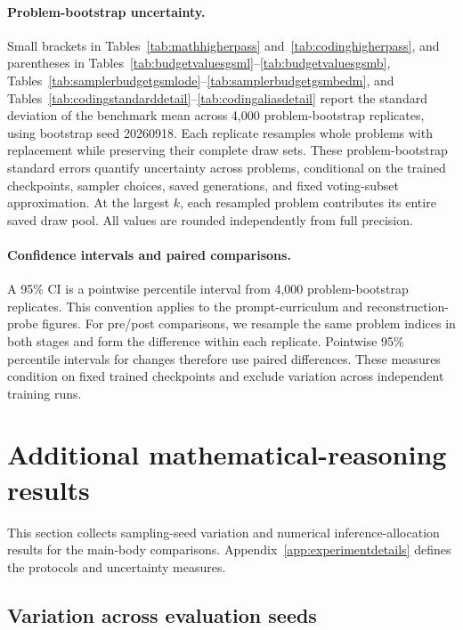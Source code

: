 \documentclass[11pt,letterpaper]{article}
\begin{document}
\paragraph{Problem-bootstrap uncertainty.}
Small brackets in Tables~\ref{tab:mathhigherpass} and~\ref{tab:codinghigherpass}, and parentheses in Tables~\ref{tab:budgetvaluesgsml}--\ref{tab:budgetvaluesgsmb}, Tables~\ref{tab:samplerbudgetgsmlode}--\ref{tab:samplerbudgetgsmbedm}, and Tables~\ref{tab:codingstandarddetail}--\ref{tab:codingaliasdetail} report the standard deviation of the benchmark mean across 4,000 problem-bootstrap replicates, using bootstrap seed 20260918. Each replicate resamples whole problems with replacement while preserving their complete draw sets. These problem-bootstrap standard errors quantify uncertainty across problems, conditional on the trained checkpoints, sampler choices, saved generations, and fixed voting-subset approximation. At the largest $k$, each resampled problem contributes its entire saved draw pool. All values are rounded independently from full precision.

\paragraph{Confidence intervals and paired comparisons.}
A 95\% CI is a pointwise percentile interval from 4,000 problem-bootstrap replicates. This convention applies to the prompt-curriculum and reconstruction-probe figures. For pre/post comparisons, we resample the same problem indices in both stages and form the difference within each replicate. Pointwise 95\% percentile intervals for changes therefore use paired differences. These measures condition on fixed trained checkpoints and exclude variation across independent training runs.


\section{Additional mathematical-reasoning results}
\label{app:mathresults}

This section collects sampling-seed variation and numerical inference-allocation results for the main-body comparisons. Appendix~\ref{app:experimentdetails} defines the protocols and uncertainty measures.


\subsection{Variation across evaluation seeds}
\label{app:seedvariability}
\end{document}
